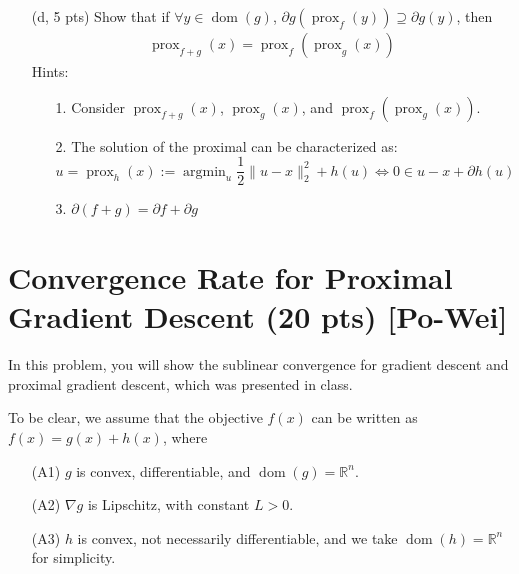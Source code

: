 \documentclass{article}
\theoremstyle{remark}
\theoremstyle{definition}
\newcommand{\argmin}{\mathop{\mathrm{argmin}}}
\newcommand{\reals}{\mathbb R}
\newcommand{\prox}{\operatorname{prox}}
\newcommand{\dom}{\operatorname{dom}}
\begin{document}
\begin{enumerate}
    \item[(d, 5 pts)] Show that if $\forall y \in \operatorname{dom}(g)$, $\partial g(\prox_f (y)) \supseteq \partial g(y)$, then 
        \begin{align}
            \prox_{f+g}(x) = \prox_{f}(\prox_{g}(x))
        \end{align}
    Hints: 
    \begin{enumerate}
        \item[1.] Consider $\prox_{f+g}(x)$, $\prox_g(x)$, and $\prox_f (\prox_g (x))$.
        \item[2.] The solution of the proximal can be characterized as: 
        \[
            u = \prox_h(x) := \argmin_u \frac 1 2 \| u - x\|_2^2 + h(u) 
                \iff 
            0 \in u - x + \partial h(u) 
        \]
        \item[3.] $\partial (f+g) = \partial f + \partial g$
    \end{enumerate}
\end{enumerate}
\section{Convergence Rate for Proximal Gradient Descent (20 pts) [Po-Wei]}
In this problem, you will show the sublinear convergence for gradient descent and proximal gradient descent, which was presented in class. 

To be clear, 
we assume that the objective $f(x)$ can be written as $f(x) = g(x) + h(x)$, where
\begin{enumerate}
\item[(A1)] $g$ is convex, differentiable, and $\dom(g) = \reals^n$.
\item[(A2)] $\nabla g$ is Lipschitz, with constant $L > 0$.
\item[(A3)] $h$ is convex, not necessarily differentiable, and we take $\dom(h) = \reals^n$ for simplicity.
\end{enumerate}
\end{document}
